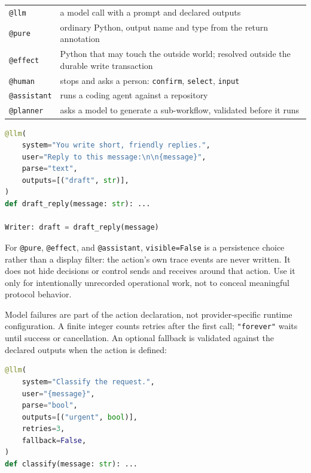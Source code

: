 \documentclass[11pt,a4paper]{article}
\begin{document}
\begin{center}
\begin{tabularx}{0.97\linewidth}{@{}lX@{}}
\toprule
\texttt{@llm} & a model call with a prompt and declared outputs \\
\texttt{@pure} & ordinary Python, output name and type from the return annotation \\
\texttt{@effect} & Python that may touch the outside world; resolved outside the durable write transaction \\
\texttt{@human} & stops and asks a person: \texttt{confirm}, \texttt{select}, \texttt{input} \\
\texttt{@assistant} & runs a coding agent against a repository \\
\texttt{@planner} & asks a model to generate a sub-workflow, validated before it runs \\
\bottomrule
\end{tabularx}
\end{center}

\begin{lstlisting}[language=Python]
@llm(
    system="You write short, friendly replies.",
    user="Reply to this message:\n\n{message}",
    parse="text",
    outputs=[("draft", str)],
)
def draft_reply(message: str): ...

Writer: draft = draft_reply(message)
\end{lstlisting}

For \texttt{@pure}, \texttt{@effect}, and \texttt{@assistant}, \texttt{visible=False} is a
persistence choice rather than a display filter: the action's own trace events
are never written. It does not hide decisions or control sends and receives
around that action. Use it only for intentionally unrecorded operational work,
not to conceal meaningful protocol behavior.

Model failures are part of the action declaration, not provider-specific
runtime configuration. A finite integer counts retries after the first call;
\texttt{"forever"} waits until success or cancellation. An optional fallback
is validated against the declared outputs when the action is defined:

\begin{lstlisting}[language=Python]
@llm(
    system="Classify the request.",
    user="{message}",
    parse="bool",
    outputs=[("urgent", bool)],
    retries=3,
    fallback=False,
)
def classify(message: str): ...
\end{lstlisting}
\end{document}
